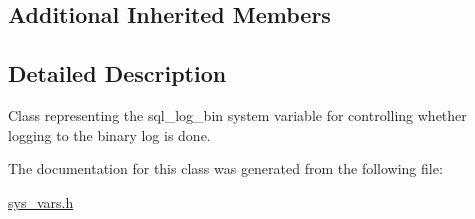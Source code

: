 \subsection*{Additional Inherited Members}


\subsection{Detailed Description}
Class representing the sql\+\_\+log\+\_\+bin system variable for controlling whether logging to the binary log is done. 

The documentation for this class was generated from the following file\+:\begin{DoxyCompactItemize}
\item 
\mbox{\hyperlink{sys__vars_8h}{sys\+\_\+vars.\+h}}\end{DoxyCompactItemize}

